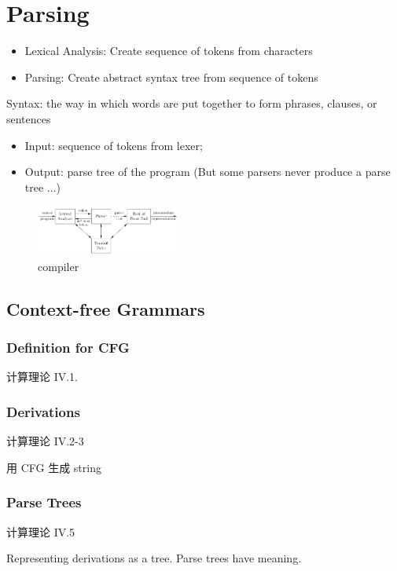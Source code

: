 \newpage
\section{Parsing}
\begin{itemize}
    \item Lexical Analysis: Create sequence of tokens from characters
    \item Parsing: Create abstract syntax tree from sequence of tokens
\end{itemize}

Syntax: the way in which words are put together to form phrases, clauses, or sentences

\begin{itemize}
    \item Input: sequence of tokens from lexer; 
    \item Output: parse tree of the program (But some parsers never produce a parse tree ...)
\end{itemize}

\begin{figure}[!htb]
    \centering
    \includegraphics[width=0.42\textwidth]{pic/CP3/compiler.png}
    \caption{compiler}
\end{figure}


\subsection{Context-free Grammars}
\subsubsection{Definition for CFG}
计算理论 IV.1.

\subsubsection{Derivations}
计算理论 IV.2-3

用 CFG 生成 string

\subsubsection{Parse Trees}
计算理论 IV.5

Representing derivations as a tree. Parse trees have meaning. 

